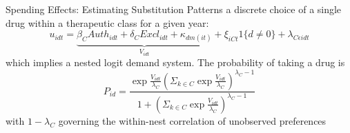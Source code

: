 \begin{frame}{Spending Effects: Estimating Substitution Patterns}
    a discrete choice of a single drug within a therapeutic class for a given year:
    $$u_{idt}= \underbrace{\beta_C Auth_{idt} + \delta_C Excl_{idt} + \kappa_{dm(it)}}_\text{$V_{idt}$} + \xi_{iCt}1\{d\neq 0\} + \lambda_{C\epsilon idt} $$
    which implies a nested logit demand system. The probability of taking a drug is
    $$P_{id}= \frac{\exp \frac{V_{idt}}{\lambda_C}(\Sigma_{k \in C} \exp \frac{V_{idt}}{\lambda_C})^{\lambda_C -1}}{1+(\Sigma_{k \in C} \exp \frac{V_{idt}}{\lambda_C})^{\lambda_C -1}}$$
    with $1-\lambda_C$ governing the within-nest correlation of unobserved preferences
\end{frame}